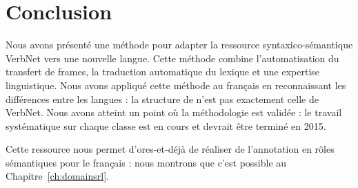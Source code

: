 \section*{Conclusion}

Nous avons présenté une méthode pour adapter la ressource syntaxico-sémantique
VerbNet vers une nouvelle langue. Cette méthode combine l'automatisation du
transfert de frames, la traduction automatique du lexique et une expertise
linguistique. Nous avons appliqué cette méthode au français en reconnaissant
les différences entre les langues : la structure de \verbenet{} n'est pas
exactement celle de VerbNet. Nous avons atteint un point où la méthodologie est
validée : le travail systématique sur chaque classe est en cours et devrait
être terminé en 2015.

Cette ressource nous permet d'ores-et-déjà de réaliser de l'annotation en rôles
sémantiques pour le français : nous montrons que c'est possible au
Chapitre~\ref{ch:domainsrl}.



